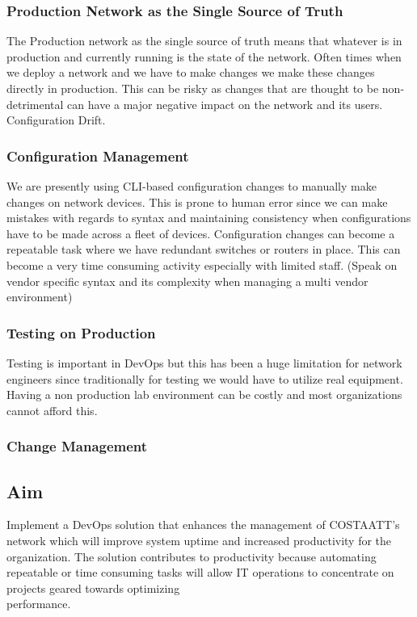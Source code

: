 \documentclass[12pt, letterpaper]{article}
\begin{document}
\medskip

	\subsubsection{Production Network as the Single Source of Truth}
The Production network as the single source of truth means that whatever is in production and currently running is the state of the network. Often times when we deploy a network and we have to make changes we make these changes directly in production. This can be risky as changes that are thought to be non-detrimental can have a major negative impact on the network and its users. 
Configuration Drift.
	
	\subsubsection{Configuration Management}
We are presently using CLI-based configuration changes to manually make changes on network devices. This is prone to human error since we can make mistakes with regards to syntax and maintaining consistency when configurations have to be made across a fleet of devices. Configuration changes can become a repeatable task where we have redundant switches or routers in place. This can become a very time consuming activity especially with limited staff. (Speak on vendor specific syntax and its complexity when managing a multi vendor environment)
	
	\subsubsection{Testing on Production}
Testing is important in DevOps but this has been a huge limitation for network engineers since traditionally for testing we would have to utilize real equipment. Having a non production lab environment can be costly and most organizations cannot afford this. 
	
	\subsubsection{Change Management}


	\subsection{Aim}
Implement a DevOps solution that enhances the management of COSTAATT's network which will improve system uptime and increased productivity for the organization. The solution contributes to productivity because automating repeatable or time consuming tasks will allow IT operations to concentrate on projects geared towards optimizing \\ performance.
\end{document}
